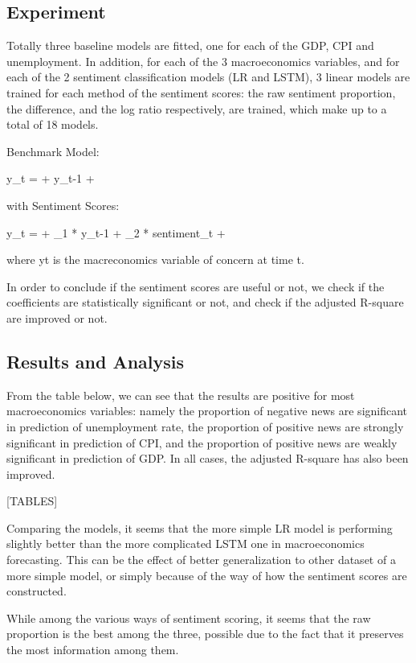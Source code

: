 \documentclass[11pt,a4paper]{article}
\begin{document}
\subsection{Experiment}

Totally three baseline models are fitted, one for each of the GDP, CPI and unemployment. In addition, for each of the 3 macroeconomics variables, and for each of the 2 sentiment classification models (LR and LSTM), 3 linear models are trained for each method of the sentiment scores: the raw sentiment proportion, the difference, and the log ratio respectively, are trained, which make up to a total of 18 models.

Benchmark Model:

y_t = \alpha + \beta * y_{t-1} + \epsilon

with Sentiment Scores:

y_t = \alpha + \beta_1 * y_{t-1} + \beta_2 * sentiment_t + \epsilon

where yt is the macreconomics variable of concern at time t.

In order to conclude if the sentiment scores are useful or not, we check if the coefficients are statistically significant or not, and  check if the adjusted R-square are improved or not.


\subsection{Results and Analysis}

From the table below, we can see that the results are positive for most macroeconomics variables: namely the proportion of negative news are significant in prediction of unemployment rate, the proportion of positive news are strongly significant in prediction of CPI, and the proportion of positive news are weakly significant in prediction of GDP. In all cases, the adjusted R-square has also been improved.

[TABLES]

Comparing the models, it seems that the more simple LR model is performing slightly better than the more complicated LSTM one in macroeconomics forecasting. This can be the effect of better generalization to other dataset of a more simple model, or simply because of the way of how the sentiment scores are constructed.

While among the various ways of sentiment scoring, it seems that the raw proportion is the best among the three, possible due to the fact that it preserves the most information among them.
\end{document}
